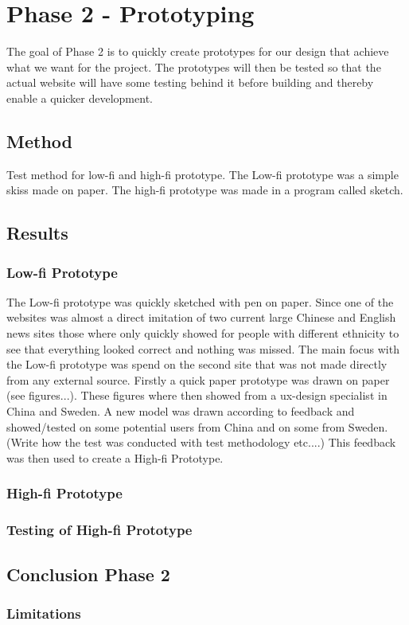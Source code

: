 
\chapter{Phase 2 - Prototyping} %

\label{Chapter5} %

The goal of Phase 2 is to quickly create prototypes for our design that achieve what we want for the project. The prototypes will then be tested so that the actual website will have some testing behind it before building and thereby enable a quicker development.

\section{Method}
Test method for low-fi and high-fi prototype. The Low-fi prototype was a simple skiss made on paper. The high-fi prototype was made in a program called sketch.

\section{Results}
\subsection{Low-fi Prototype}
The Low-fi prototype was quickly sketched with pen on paper. Since one of the websites was almost a direct imitation of two current large Chinese and English news sites those where only quickly showed for people with different ethnicity to see that everything looked correct and nothing was missed. The main focus with the Low-fi prototype was spend on the second site that was not made directly from any external source. Firstly a quick paper prototype was drawn on paper  (see figures...). These figures where then showed from a ux-design specialist in China and Sweden. A new model was drawn according to feedback and showed/tested on some potential users from China and on some from Sweden. (Write how the test was conducted with test methodology etc....) This feedback was then used to create a High-fi Prototype.

\subsection{High-fi Prototype}

\subsection{Testing of High-fi Prototype}

\section{Conclusion Phase 2}


\subsection{Limitations}
